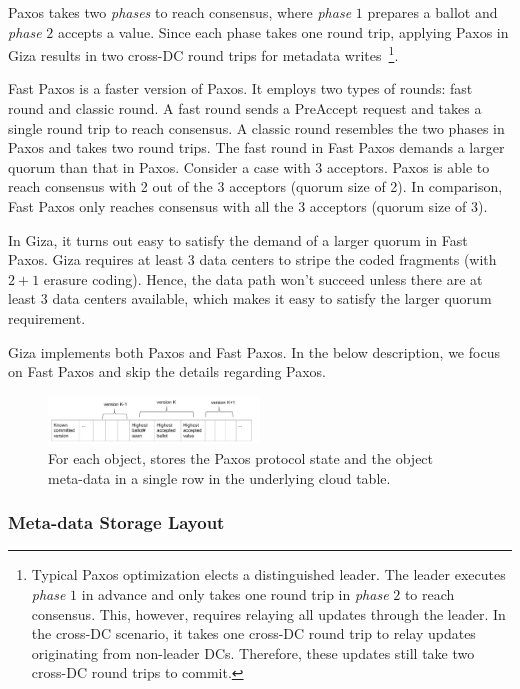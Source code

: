 Paxos takes two {\em phases} to reach consensus, where {\em phase} $1$ prepares a ballot and {\em phase} $2$ accepts a value. Since each phase takes one round trip, applying Paxos in Giza results in two cross-DC round trips for metadata writes~\footnote{Typical Paxos optimization elects a distinguished leader. The leader executes {\em phase} $1$ in advance and only takes one round trip in {\em phase} $2$ to reach consensus. This, however, requires relaying all updates through the leader. In the cross-DC scenario, it takes one cross-DC round trip to relay updates originating from non-leader DCs. Therefore, these updates still take two cross-DC round trips to commit.}.

Fast Paxos is a faster version of Paxos. It employs two types of rounds: fast round and classic round. A fast round sends a PreAccept request and takes a single round trip to reach consensus. A classic round resembles the two phases in Paxos and takes two round trips.
The fast round in Fast Paxos demands a larger quorum than that in Paxos. Consider a case with $3$ acceptors. Paxos is able to reach consensus with 2 out of the 3 acceptors (quorum size of 2). In comparison, Fast Paxos only reaches consensus with all the 3 acceptors (quorum size of 3).

In Giza, it turns out easy to satisfy the demand of a larger quorum in Fast Paxos. Giza requires at least 3 data centers to stripe the coded fragments (with $2 + 1$ erasure coding). Hence, the data path won't succeed unless there are at least 3 data centers available, which makes it easy to satisfy the larger quorum requirement.

Giza implements both Paxos and Fast Paxos. In the below description, we focus on Fast Paxos and skip the details regarding Paxos.

\begin{figure}[tp]
\centering
\includegraphics[width=0.5\textwidth]{fig/Giza_Metadata}
\caption{For each object, \name stores the Paxos protocol state and the object meta-data 
in a single row in the underlying cloud table.\label{fig:metadata}}
\end{figure}

\subsubsection{Meta-data Storage Layout}

